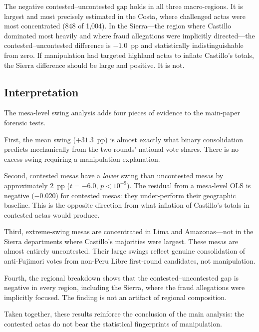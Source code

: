 The negative contested--uncontested gap holds in all three macro-regions.
It is largest and most precisely estimated in the Costa, where challenged
actas were most concentrated (848 of 1,004). In the Sierra---the region
where Castillo dominated most heavily and where fraud allegations were
implicitly directed---the contested--uncontested difference is $-1.0$~pp
and statistically indistinguishable from zero. If manipulation had
targeted highland actas to inflate Castillo's totals, the Sierra
difference should be large and positive. It is not.

\subsection{Interpretation}
\label{app:swing:interpretation}

The mesa-level swing analysis adds four pieces of evidence to the
main-paper forensic tests.

First, the mean swing ($+31.3$~pp) is almost exactly what binary
consolidation predicts mechanically from the two rounds' national vote
shares. There is no excess swing requiring a manipulation explanation.

Second, contested mesas have a \emph{lower} swing than uncontested mesas
by approximately 2~pp ($t = -6.0$, $p < 10^{-9}$). The residual from a
mesa-level OLS is negative ($-0.020$) for contested mesas: they under-perform
their geographic baseline. This is the opposite direction from what inflation
of Castillo's totals in contested actas would produce.

Third, extreme-swing mesas are concentrated in Lima and Amazonas---not in
the Sierra departments where Castillo's majorities were largest. These mesas
are almost entirely uncontested. Their large swings reflect genuine
consolidation of anti-Fujimori votes from non-Peru Libre first-round
candidates, not manipulation.

Fourth, the regional breakdown shows that the contested--uncontested gap is
negative in every region, including the Sierra, where the fraud allegations
were implicitly focused. The finding is not an artifact of regional composition.

Taken together, these results reinforce the conclusion of the main analysis:
the contested actas do not bear the statistical fingerprints of manipulation.
